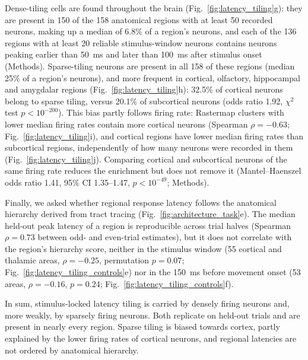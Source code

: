 \documentclass[10pt,lineno]{elife}
\begin{document}
Dense-tiling cells are found throughout the brain (Fig.~\ref{fig:latency_tiling}g): they are present in 150 of the 158 anatomical regions with at least 50 recorded neurons, making up a median of 6.8\% of a region's neurons, and each of the 136 regions with at least 20 reliable stimulus-window neurons contains neurons peaking earlier than 50~ms and later than 100~ms after stimulus onset (Methods). Sparse-tiling neurons are present in all 158 of these regions (median 25\% of a region's neurons), and more frequent in cortical, olfactory, hippocampal and amygdalar regions (Fig.~\ref{fig:latency_tiling}h): 32.5\% of cortical neurons belong to sparse tiling, versus 20.1\% of subcortical neurons (odds ratio 1.92, $\chi^2$ test $p<10^{-200}$). This bias partly follows firing rate: Rastermap clusters with lower median firing rates contain more cortical neurons (Spearman $\rho=-0.63$; Fig.~\ref{fig:latency_tiling}i), and cortical regions have lower median firing rates than subcortical regions, independently of how many neurons were recorded in them (Fig.~\ref{fig:latency_tiling}j). Comparing cortical and subcortical neurons of the same firing rate reduces the enrichment but does not remove it (Mantel--Haenszel odds ratio 1.41, 95\% CI 1.35--1.47, $p<10^{-49}$; Methods).

Finally, we asked whether regional response latency follows the anatomical hierarchy derived from tract tracing \cite{harris2019hierarchical} (Fig.~\ref{fig:architecture_task}e). The median held-out peak latency of a region is reproducible across trial halves (Spearman $\rho=0.73$ between odd- and even-trial estimates), but it does not correlate with the region's hierarchy score, neither in the stimulus window (55 cortical and thalamic areas, $\rho=-0.25$, permutation $p=0.07$; Fig.~\ref{fig:latency_tiling_controls}e) nor in the 150~ms before movement onset (53 areas, $\rho=-0.16$, $p=0.24$; Fig.~\ref{fig:latency_tiling_controls}f).

In sum, stimulus-locked latency tiling is carried by densely firing neurons and, more weakly, by sparsely firing neurons. Both replicate on held-out trials and are present in nearly every region. Sparse tiling is biased towards cortex, partly explained by the lower firing rates of cortical neurons, and regional latencies are not ordered by anatomical hierarchy.
\end{document}
